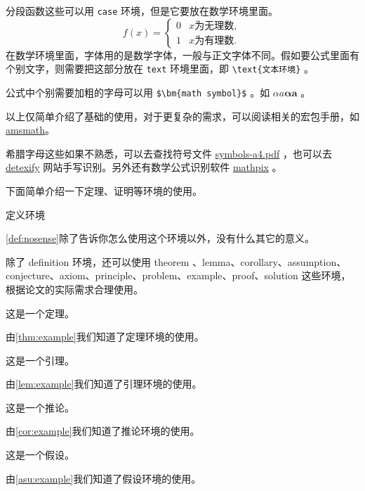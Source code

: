 \documentclass[withoutpreface,bwprint]{cumcmthesis} %
\begin{document}
分段函数这些可以用 \verb|case| 环境，但是它要放在数学环境里面。
\[
f(x) =
    \begin{cases}
        0 &  x \text{为无理数} ,\\
        1 &  x \text{为有理数} .
    \end{cases}
\]
在数学环境里面，字体用的是数学字体，一般与正文字体不同。假如要公式里面有个别文字，则需要把这部分放在 \verb|text| 环境里面，即 \verb|\text{文本环境}| 。

公式中个别需要加粗的字母可以用 \verb|$\bm{math symbol}$| 。如 $ \alpha a\bm{\alpha a} $ 。

以上仅简单介绍了基础的使用，对于更复杂的需求，可以阅读相关的宏包手册，如 \href{http://texdoc.net/texmf-dist/doc/latex/amsmath/amsldoc.pdf}{amsmath}。

希腊字母这些如果不熟悉，可以去查找符号文件 \href{http://mirrors.ctan.org/info/symbols/comprehensive/symbols-a4.pdf}{symbols-a4.pdf} ，也可以去 \href{http://detexify.kirelabs.org/classify.html}{detexify} 网站手写识别。另外还有数学公式识别软件 \href{https://mathpix.com/}{mathpix} 。

下面简单介绍一下定理、证明等环境的使用。
\begin{definition}
    定义环境
    \label{def:nosense}
\end{definition}
\cref{def:nosense}除了告诉你怎么使用这个环境以外，没有什么其它的意义。

除了 definition 环境，还可以使用 theorem 、lemma、corollary、assumption、conjecture、axiom、principle、problem、example、proof、solution 这些环境，根据论文的实际需求合理使用。

\begin{theorem}
    这是一个定理。
    \label{thm:example}
\end{theorem}
由\cref{thm:example}我们知道了定理环境的使用。

\begin{lemma}
    这是一个引理。
    \label{lem:example}
\end{lemma}
由\cref{lem:example}我们知道了引理环境的使用。

\begin{corollary}
    这是一个推论。
    \label{cor:example}
\end{corollary}
由\cref{cor:example}我们知道了推论环境的使用。

\begin{assumption}
    这是一个假设。
    \label{asu:example}
\end{assumption}
由\cref{asu:example}我们知道了假设环境的使用。
\end{document}
